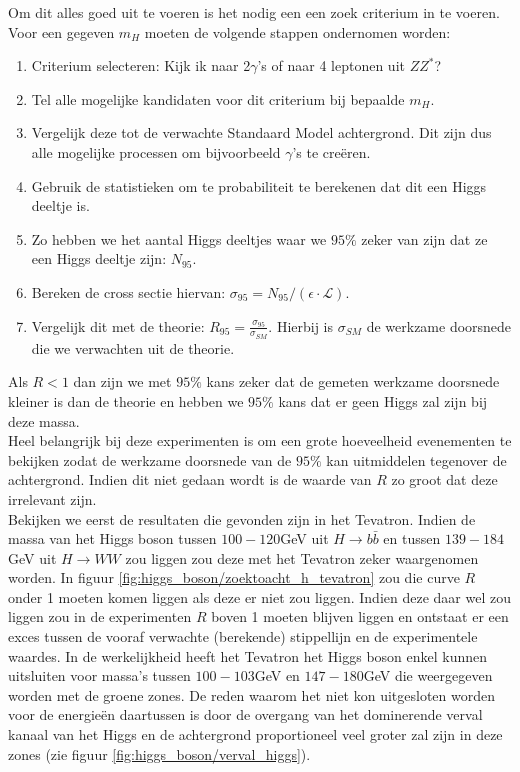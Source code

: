 \documentclass[../main.tex]{subfiles}
\begin{document}
Om dit alles goed uit te voeren is het nodig een een zoek criterium in te voeren. Voor een gegeven $m_H$ moeten de volgende stappen ondernomen worden:
\begin{enumerate}
    \item Criterium selecteren: Kijk ik naar 2$\gamma$'s of naar 4 leptonen uit $ZZ^*$?
    \item Tel alle mogelijke kandidaten voor dit criterium bij bepaalde $m_H$.
    \item Vergelijk deze tot de verwachte Standaard Model achtergrond. Dit zijn dus alle mogelijke processen om bijvoorbeeld $\gamma$'s te creëren.
    \item Gebruik de statistieken om te probabiliteit te berekenen dat dit een Higgs deeltje is.
    \item Zo hebben we het aantal Higgs deeltjes waar we $95\%$ zeker van zijn dat ze een Higgs deeltje zijn: $N_{95}$.
    \item Bereken de cross sectie hiervan: $\sigma_{95}=N_{95} /(\epsilon \cdot \mathcal{L})$.
    \item Vergelijk dit met de theorie: $R_{95}=\frac{\sigma_{95}}{\sigma_{S M}}$. Hierbij is $\sigma_{S M}$ de werkzame doorsnede die we verwachten uit de theorie.
\end{enumerate}
Als $R<1$ dan zijn we met $95\%$ kans zeker dat de gemeten werkzame doorsnede kleiner is dan de theorie en hebben we $95\%$ kans dat er geen Higgs zal zijn bij deze massa.\\

Heel belangrijk bij deze experimenten is om een grote hoeveelheid evenementen te bekijken zodat de werkzame doorsnede van de $95\%$ kan uitmiddelen tegenover de achtergrond. Indien dit niet gedaan wordt is de waarde van $R$ zo groot dat deze irrelevant zijn.\\
Bekijken we eerst de resultaten die gevonden zijn in het Tevatron. Indien de massa van het Higgs boson tussen $100-120$GeV uit $H \rightarrow b \bar{b}$ en tussen $139-184$GeV uit $H \rightarrow W W$ zou liggen zou deze met het Tevatron zeker waargenomen worden. In figuur \ref{fig:higgs_boson/zoektoacht_h_tevatron} zou die curve $R$ onder 1 moeten komen liggen als deze er niet zou liggen. Indien deze daar wel zou liggen zou in de experimenten $R$ boven 1 moeten blijven liggen en ontstaat er een exces tussen de vooraf verwachte (berekende) stippellijn en de experimentele waardes. In de werkelijkheid heeft het Tevatron het Higgs boson enkel kunnen uitsluiten voor massa's tussen $100-103$GeV en $147-180$GeV die weergegeven worden met de groene zones. De reden waarom het niet kon uitgesloten worden voor de energieën daartussen is door de overgang van het dominerende verval kanaal van het Higgs en de achtergrond proportioneel veel groter zal zijn in deze zones (zie figuur \ref{fig:higgs_boson/verval_higgs}).
\end{document}
